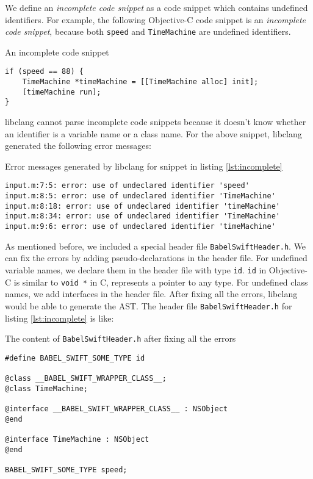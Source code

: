 \documentclass{sfuthesis}
\begin{document}
We define an \emph{incomplete code snippet} as a code snippet which contains undefined identifiers. For example, the following Objective-C code snippet is an \emph{incomplete code snippet}, because both \texttt{speed} and \texttt{TimeMachine} are undefined identifiers.

\begin{listing}
\caption{An incomplete code snippet}
\label{lst:incomplete}
\begin{verbatim}
if (speed == 88) {
    TimeMachine *timeMachine = [[TimeMachine alloc] init];
    [timeMachine run];
}
\end{verbatim}
\end{listing}

libclang cannot parse incomplete code snippets because it doesn't know whether an identifier is a variable name or a class name. For the above snippet, libclang generated the following error messages:

\begin{listing}
\caption{Error messages generated by libclang for snippet in listing \ref{lst:incomplete}}
\begin{verbatim}
input.m:7:5: error: use of undeclared identifier 'speed'
input.m:8:5: error: use of undeclared identifier 'TimeMachine'
input.m:8:18: error: use of undeclared identifier 'timeMachine'
input.m:8:34: error: use of undeclared identifier 'TimeMachine'
input.m:9:6: error: use of undeclared identifier 'timeMachine'
\end{verbatim}
\end{listing}

As mentioned before, we included a special header file \texttt{BabelSwiftHeader.h}. We can fix the errors by adding pseudo-declarations in the header file. For undefined variable names, we declare them in the header file with type \texttt{id}. \texttt{id} in Objective-C is similar to \texttt{void *} in C, represents a pointer to any type. For undefined class names, we add interfaces in the header file. After fixing all the errors, libclang would be able to generate the AST. The header file \texttt{BabelSwiftHeader.h} for listing \ref{lst:incomplete} is like:

\begin{listing}
\caption{The content of \texttt{BabelSwiftHeader.h} after fixing all the errors}
\begin{verbatim}
#define BABEL_SWIFT_SOME_TYPE id

@class __BABEL_SWIFT_WRAPPER_CLASS__;
@class TimeMachine;

@interface __BABEL_SWIFT_WRAPPER_CLASS__ : NSObject
@end

@interface TimeMachine : NSObject
@end

BABEL_SWIFT_SOME_TYPE speed;
\end{verbatim}
\end{listing}
\end{document}
